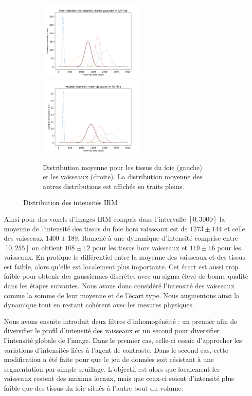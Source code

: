 \begin{figure}[!ht]
  \begin{subfigure}{\textwidth}
    \centering
    \includegraphics[height=4cm]{Images/gen_mri_liver_mean_intensity.pdf}
    \includegraphics[height=4cm]{Images/gen_mri_vessels_mean_intensity.pdf}
    \caption{Distribution moyenne pour les tissus du foie (gauche) et les vaisseaux (droite). La distribution moyenne des autres distributions est affichée en traits pleins.}
  \end{subfigure}
  \caption{Distribution des intensités IRM}
  \label{fig:Distributions_mri_intensities}
\end{figure}

Ainsi pour des voxels d'images IRM compris dans l'intervalle $[0,3000]$ la moyenne de l'intensité des tissus du foie hors vaisseaux est de $1273 \pm 144$ et celle des vaisseaux $1400 \pm 189$. Ramené à une dynamique d'intensité comprise entre $[0, 255]$ on obtient $108 \pm 12$ pour les tissus hors vaisseaux et $119 \pm 16$ pour les vaisseaux. En pratique le différentiel entre la moyenne des vaisseaux et des tissus est faible, alors qu'elle est localement plus importante. Cet écart est aussi trop faible pour obtenir des gaussiennes discrètes avec un sigma élevé de bonne qualité dans les étapes suivantes. Nous avons donc considéré l'intensité des vaisseaux comme la somme de leur moyenne et de l'écart type. Nous augmentons ainsi la dynamique tout en restant cohérent avec les mesures physiques.

Nous avons ensuite introduit deux filtres d'inhomogénéité : un premier afin de diversifier le profil d'intensité des vaisseaux et un second pour diversifier l'intensité globale de l'image. Dans le premier cas, celle-ci essaie d'approcher les variations d'intensités liées à l'agent de contraste. Dans le second cas, cette modification a été faite pour que le jeu de données soit résistant à une segmentation par simple seuillage. L'objectif est alors que localement les vaisseaux restent des maxima locaux, mais que ceux-ci soient d'intensité plus faible que des tissus du foie situés à l'autre bout du volume.

